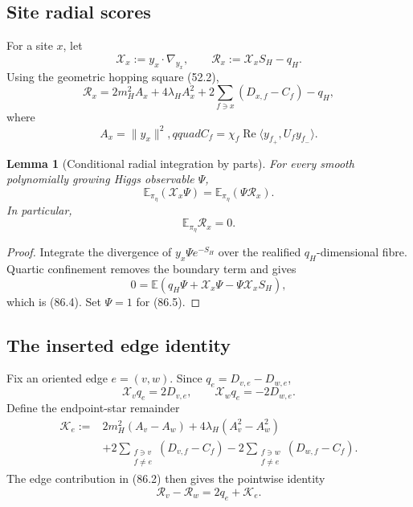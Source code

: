 \documentclass[11pt]{article}
\newtheorem{lemma}[theorem]{Lemma}
\theoremstyle{remark}
\begin{document}
\subsection{Site radial scores}

For a site \(x\), let
\[
 \mathcal X_x:=y_x\cdot\nabla_{y_x},
 \qquad
 \mathcal R_x:=\mathcal X_xS_H-q_H.               \tag{86.1}
\]
Using the geometric hopping square (52.2),
\[
\boxed{
 \mathcal R_x
 =2m_H^2A_x+4\lambda_HA_x^2
 +2\sum_{f\ni x}(D_{x,f}-C_f)-q_H,}               \tag{86.2}
\]
where
\[
 A_x=\|y_x\|^2,qquad
 C_f=\chi_f\operatorname{Re}
 \langle y_{f_+},U_fy_{f_-}\rangle.              \tag{86.3}
\]

\begin{lemma}[Conditional radial integration by parts]
\label{lem:v17v86-ibp}
For every smooth polynomially growing Higgs observable \(\Psi\),
\[
\boxed{
 \mathbb E_{\pi_\eta}(\mathcal X_x\Psi)
 =\mathbb E_{\pi_\eta}(\Psi\mathcal R_x).}        \tag{86.4}
\]
In particular,
\[
 \mathbb E_{\pi_\eta}\mathcal R_x=0.             \tag{86.5}
\]
\end{lemma}

\begin{proof}
Integrate the divergence of
\(y_x\Psi e^{-S_H}\) over the realified \(q_H\)-dimensional fibre.
Quartic confinement removes the boundary term and gives
\[
 0=\mathbb E(q_H\Psi+\mathcal X_x\Psi
             -\Psi\mathcal X_xS_H),
\]
which is (86.4).  Set \(\Psi=1\) for (86.5).
\end{proof}

\subsection{The inserted edge identity}

Fix an oriented edge \(e=(v,w)\).  Since
\(q_e=D_{v,e}-D_{w,e}\),
\[
 \mathcal X_vq_e=2D_{v,e},
 \qquad
 \mathcal X_wq_e=-2D_{w,e}.                      \tag{86.6}
\]
Define the endpoint-star remainder
\[
\begin{aligned}
 \mathcal K_e:={}&
 2m_H^2(A_v-A_w)+4\lambda_H(A_v^2-A_w^2)\\
 &+2\sum_{\substack{f\ni v\\f\neq e}}(D_{v,f}-C_f)
 -2\sum_{\substack{f\ni w\\f\neq e}}(D_{w,f}-C_f).            \tag{86.7}
\end{aligned}
\]
The edge contribution in (86.2) then gives the pointwise identity
\[
 \mathcal R_v-\mathcal R_w=2q_e+\mathcal K_e.     \tag{86.8}
\]
\end{document}

